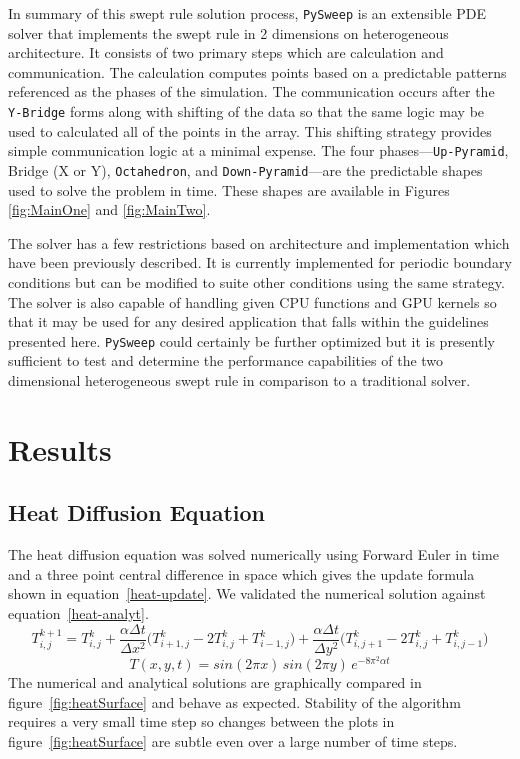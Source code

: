 \documentclass[review]{elsarticle}
\def\pysweep{\texttt{PySweep}}
\def\Up{\texttt{Up-Pyramid}}
\def\Down{\texttt{Down-Pyramid}}
\def\Oct{\texttt{Octahedron}}
\def\Yb{\texttt{Y-Bridge}}
\begin{document}
\par
In summary of this swept rule solution process, \pysweep{} is an extensible PDE solver that implements the swept rule in 2 dimensions on heterogeneous architecture. It consists of two primary steps which are calculation and communication. The calculation computes points based on a predictable patterns referenced as the phases of the simulation. The communication occurs after the \Yb{} forms along with shifting of the data so that the same logic may be used to calculated all of the points in the array. This shifting strategy provides simple communication logic at a minimal expense. The four phases---\Up{}, Bridge (X or Y), \Oct{}, and \Down{}---are the predictable shapes used to solve the problem in time. These shapes are available in Figures \ref{fig:MainOne} and \ref{fig:MainTwo}. 
\par
The solver has a few restrictions based on architecture and implementation which have been previously described. It is currently implemented for periodic boundary conditions but can be modified to suite other conditions using the same strategy. The solver is also capable of handling given CPU functions and GPU kernels so that it may be used for any desired application that falls within the guidelines presented here. \pysweep{} could certainly be further optimized but it is presently sufficient to test and determine the performance capabilities of the two dimensional heterogeneous swept rule in comparison to a traditional solver.

\section{Results}
\label{results-section}

\subsection{Heat Diffusion Equation}
\label{hdeResults}
The heat diffusion equation was solved numerically using Forward Euler in time and a three point central difference in space which gives the update formula shown in equation~\ref{heat-update}. We  validated the numerical solution against equation~\ref{heat-analyt}.
\begin{equation}
    \label{heat-update}
    T_{i,j}^{k+1} = T_{i,j}^{k}+\frac{\alpha \Delta t}{\Delta x^2}\big(T_{i+1,j}^{k}-2T_{i,j}^{k}+T_{i-1,j}^{k}\big)+\frac{\alpha \Delta t}{\Delta y^2}\big(T_{i,j+1}^{k}-2T_{i,j}^{k}+T_{i,j-1}^{k}\big)
\end{equation}
\begin{equation}
\label{heat-analyt}
    T(x,y,t) = sin(2\pi x)\,sin(2\pi y)\,e^{-8\pi^2\alpha t}
\end{equation}
The numerical and analytical solutions are graphically compared in figure~\ref{fig:heatSurface} and behave as expected. Stability of the algorithm requires a very small time step so changes between the plots in figure~\ref{fig:heatSurface} are subtle even over a large number of time steps.
\end{document}
